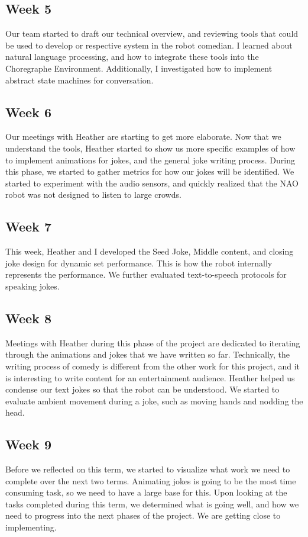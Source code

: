 \documentclass[onecolumn, draftclsnofoot,10pt, compsoc]{IEEEtran}
\begin{document}
\subsection{Week 5}
	Our team started to draft our technical overview, and reviewing tools that could be used to develop or respective system in the robot comedian. I learned about natural language processing, and how to integrate these tools into the Choregraphe Environment. Additionally, I investigated how to implement abstract state machines for conversation.
\subsection{Week 6}
	Our meetings with Heather are starting to get more elaborate. Now that we understand the tools, Heather started to show us more specific examples of how to implement animations for jokes, and the general joke writing process. During this phase, we started to gather metrics for how our jokes will be identified. We started to experiment with the audio sensors, and quickly realized that the NAO robot was not designed to listen to large crowds.
\subsection{Week 7}
	This week, Heather and I developed the Seed Joke, Middle content, and closing joke design for dynamic set performance. This is how the robot internally represents the performance. We further evaluated text-to-speech protocols for speaking jokes.
\subsection{Week 8}
	Meetings with Heather during this phase of the project are dedicated to iterating through the animations and jokes that we have written so far. Technically, the writing process of comedy is different from the other work for this project, and it is interesting to write content for an entertainment audience. Heather helped us condense our text jokes so that the robot can be understood. We started to evaluate ambient movement during a joke, such as moving hands and nodding the head.
\subsection{Week 9}
	Before we reflected on this term, we started to visualize what work we need to complete over the next two terms. Animating jokes is going to be the most time consuming task, so we need to have a large base for this. Upon looking at the tasks completed during this term, we determined what is going well, and how we need to progress into the next phases of the project. We are getting close to implementing.
\end{document}
